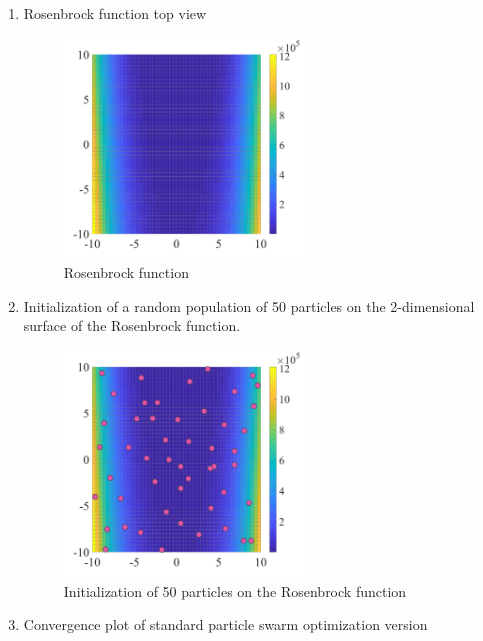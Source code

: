 \begin{enumerate}
    \item Rosenbrock function top view
    \begin{figure} [H]
    \centering
        \includegraphics[width=0.60\textwidth]{"Part 2 - Search-Based Optimization/Particle Swarm Optimization/Images/rosenbrock.PNG"}
        \caption{Rosenbrock function}
        \label{fig:rosenbrock_function}
    \end{figure}
    
    \item Initialization of a random population of 50 particles on the 2-dimensional surface of the Rosenbrock function.
    \begin{figure} [H]
    \centering
        \includegraphics[width=0.60\textwidth]{"Part 2 - Search-Based Optimization/Particle Swarm Optimization/Images/rosenbrock_plot_particles.PNG"}
        \caption{Initialization of 50 particles on the Rosenbrock function}
        \label{fig:rosenbrock_function_inicializarion_particles}
    \end{figure}

    \item Convergence plot of standard particle swarm optimization version 
    

\end{enumerate}
